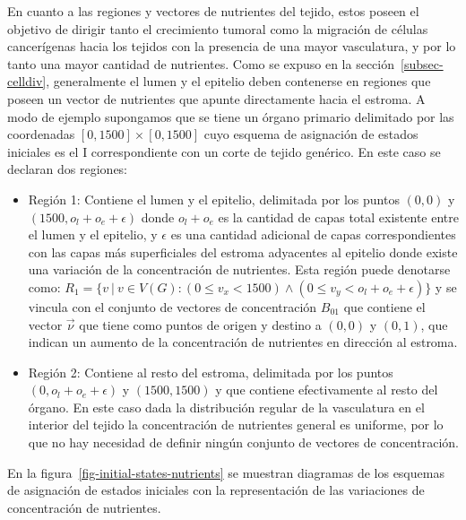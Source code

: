 En cuanto a las regiones y vectores de nutrientes del tejido, estos poseen el objetivo de dirigir tanto el crecimiento tumoral como la migraci\'on de c\'elulas cancer\'igenas hacia los tejidos con la presencia de una mayor vasculatura, y por lo tanto una mayor cantidad de nutrientes. Como se expuso en la secci\'on~\ref{subsec-celldiv}, generalmente el lumen y el epitelio deben contenerse en regiones que poseen un vector de nutrientes que apunte directamente hacia el estroma. A modo de ejemplo supongamos que se tiene un \'organo primario delimitado por las coordenadas $[0,1500] \times [0,1500]$ cuyo esquema de asignaci\'on de estados iniciales es el I correspondiente con un corte de tejido gen\'erico. En este caso se declaran dos regiones: 
\begin{itemize}
\item Regi\'on 1: Contiene el lumen y el epitelio, delimitada por los puntos $(0,0)$ y $(1500,o_l + o_e + \epsilon)$ donde $o_l + o_e$ es la cantidad de capas total existente entre el lumen y el epitelio, y $\epsilon$ es una cantidad adicional de capas correspondientes con las capas m\'as superficiales del estroma adyacentes al epitelio donde existe una variaci\'on de la concentraci\'on de nutrientes. Esta regi\'on puede denotarse como: $R_1 = \lbrace v~|~v \in V(G) : (0 \leq v_x < 1500) \wedge (0 \leq v_y < o_l + o_e + \epsilon) \rbrace$ y se vincula con el conjunto de vectores de concentraci\'on $B_{01}$ que contiene el vector $\overrightarrow{\nu}$ que tiene como puntos de origen y destino a $(0,0)$ y $(0,1)$, que indican un aumento de la concentraci\'on de nutrientes en direcci\'on al estroma.

\item Regi\'on 2: Contiene al resto del estroma, delimitada por los puntos $(0,o_l + o_e + \epsilon)$ y $(1500,1500)$ y que contiene efectivamente al resto del \'organo. En este caso dada la distribuci\'on regular de la vasculatura en el interior del tejido la concentraci\'on de nutrientes general es uniforme, por lo que no hay necesidad de definir ning\'un conjunto de vectores de concentraci\'on. 
\end{itemize}

En la figura~\ref{fig-initial-states-nutrients} se muestran diagramas de los esquemas de asignaci\'on de estados iniciales con la representaci\'on de las variaciones de concentraci\'on de nutrientes.

